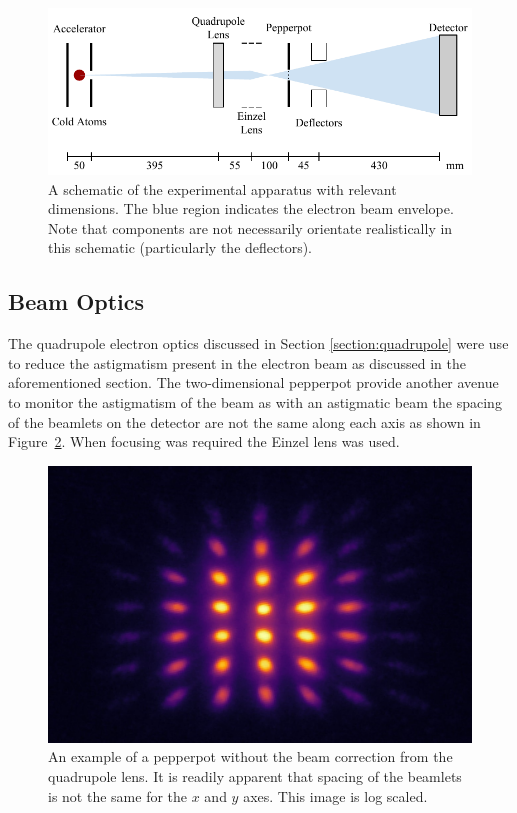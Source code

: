 \begin{figure}
\center
\includegraphics{part2/Figs/EmittanceApparatusSchematic.pdf}
\caption{A schematic of the experimental apparatus with relevant dimensions. The blue region indicates the electron beam envelope. Note that components are not necessarily orientate realistically in this schematic (particularly the deflectors).}
\label{figure:emittance_schematic}
\end{figure}

\subsection{Beam Optics}
The quadrupole electron optics discussed in Section \ref{section:quadrupole} were use to reduce the astigmatism present in the electron beam as discussed in the aforementioned section.
The two-dimensional pepperpot provide another avenue to monitor the astigmatism of the beam as with an astigmatic beam the spacing of the beamlets on the detector are not the same along each axis as shown in Figure~\ref{figure:astigmatic_pepperpot}.
When focusing was required the Einzel lens was used.

\begin{figure}
    \center
    \includegraphics[width=0.5\linewidth]{part2/Figs/example_astigmatic_pepperpot.jpeg}
    \caption{An example of a pepperpot without the beam correction from the quadrupole lens. It is readily apparent that spacing of the beamlets is not the same for the $x$ and $y$ axes. This image is log scaled.}
    \label{figure:astigmatic_pepperpot}
\end{figure}


